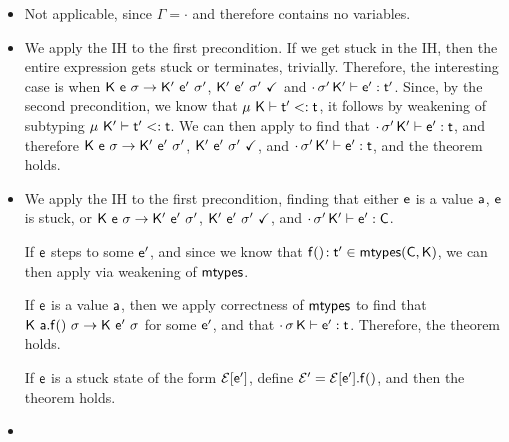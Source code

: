 \documentclass[acmlarge, anonymous, authordraft]{acmart}
\begin{document}
\begin{itemize}
  \item {}
        Not applicable, since $\Gamma = \cdot$ and therefore contains no variables.
  \item {}

        We apply the IH to the first precondition. If we get stuck in the IH, then the entire
        expression gets stuck or terminates, trivially. Therefore, the interesting case is when
        ${{\sf{K}}}~{{\sf{e}}}~{\sigma} \rightarrow {{\ensuremath{{\sf{K'}}}}}~{{{{\sf{e'}}}}}~{{{\sigma'}}}$, ${{\sf{K'}}}~{{{\sf{e'}}}}~{{\sigma'}}~\checkmark$ and $\EnvType\cdot\sp\Kp\ep\tp$. Since, by the
        second precondition, we know that $\StrSub \M\K \tp \t$, it follows by weakening of subtyping $\StrSub\M\Kp\tp\t$.
        We can then apply  to find that $\EnvType\cdot\sp\Kp\ep\t$, and therefore ${{\sf{K}}}~{{\sf{e}}}~{\sigma} \rightarrow {{\ensuremath{{\sf{K'}}}}}~{{{{\sf{e'}}}}}~{{{\sigma'}}}$, ${{\sf{K'}}}~{{{\sf{e'}}}}~{{\sigma'}}~\checkmark$, and $\EnvType\cdot\sp\Kp\ep\t$, and the theorem holds.
  \item {}

        We apply the IH to the first precondition, finding that either ${\sf{e}}$ is a value ${\sf{a}}$, ${\sf{e}}$ is stuck, or ${{\sf{K}}}~{{\sf{e}}}~{\sigma} \rightarrow {{\ensuremath{{\sf{K'}}}}}~{{{{\sf{e'}}}}}~{{{\sigma'}}}$, ${{\sf{K'}}}~{{{\sf{e'}}}}~{{\sigma'}}~\checkmark$, and $\cdot\,{{\sigma'}}\,{{\sf{K'}}}\vdash {{\ensuremath{{\sf{e'}}}}} : {\sf{C}}$. 

        If ${\sf{e}}$ steps to some ${{{\sf{e'}}}}$, and since we know that $\Mtype\f{}\tp \in \classoff{\C}{\K}$, we can then apply  via weakening of ${\sf{mtypes}}$.

        If ${\sf{e}}$ is a value ${\sf{a}}$, then we apply correctness of ${\sf{mtypes}}$ to find that ${{\sf{K}}}~{{\sf{a}}.{\sf{f}}()}~{\sigma} \rightarrow {\ensuremath{{\sf{K}}}}~{{{{\sf{e'}}}}}~{\sigma}$ for some ${{{\sf{e'}}}}$, and that $\EnvType\cdot\s\K\ep\t$. Therefore, the theorem holds.

        If ${\sf{e}}$ is a stuck state of the form $\mathcal{E}[{{{\sf{e'}}}}]$, define $\mathcal{E}' = \mathcal{E}[{{{\sf{e'}}}}].{\sf{f}}()$, and then the theorem holds.
  \item {}


\end{itemize}
\end{document}
